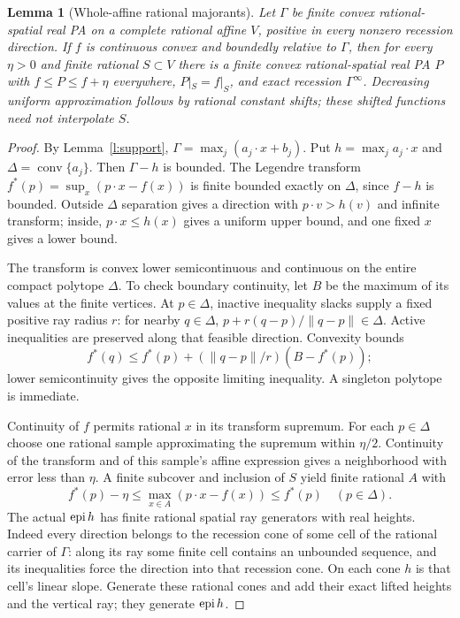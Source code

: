 \documentclass[11pt]{article}
\newtheorem{lemma}[theorem]{Lemma}
\theoremstyle{definition}\newtheorem{definition}[theorem]{Definition}
\theoremstyle{remark}\newtheorem{remark}[theorem]{Remark}
\newcommand{\conv}{\operatorname{conv}}\newcommand{\cone}{\operatorname{cone}}
\begin{document}
\begin{lemma}[Whole-affine rational majorants]\label{l:majorant}
Let $\Gamma$ be finite convex rational-spatial real PA on a complete rational affine $V$, positive in every nonzero recession direction. If $f$ is continuous convex and boundedly relative to $\Gamma$, then for every $\eta>0$ and finite rational $S\subset V$ there is a finite convex rational-spatial real PA $P$ with $f\leq P\leq f+\eta$ everywhere, $P|_S=f|_S$, and exact recession $\Gamma^\infty$. Decreasing uniform approximation follows by rational constant shifts; these shifted functions need not interpolate $S$.
\end{lemma}
\begin{proof}
By Lemma~\ref{l:support}, $\Gamma=\max_j(a_j\cdot x+b_j)$. Put $h=\max_j a_j\cdot x$ and $\Delta=\conv\{a_j\}$. Then $\Gamma-h$ is bounded. The Legendre transform $f^*(p)=\sup_x(p\cdot x-f(x))$ is finite bounded exactly on $\Delta$, since $f-h$ is bounded. Outside $\Delta$ separation gives a direction with $p\cdot v>h(v)$ and infinite transform; inside, $p\cdot x\leq h(x)$ gives a uniform upper bound, and one fixed $x$ gives a lower bound.

The transform is convex lower semicontinuous and continuous on the entire compact polytope $\Delta$. To check boundary continuity, let $B$ be the maximum of its values at the finite vertices. At $p\in\Delta$, inactive inequality slacks supply a fixed positive ray radius $r$: for nearby $q\in\Delta$, $p+r(q-p)/\|q-p\|\in\Delta$. Active inequalities are preserved along that feasible direction. Convexity bounds
\[
 f^*(q)\leq f^*(p)+(\|q-p\|/r)(B-f^*(p));
\]
lower semicontinuity gives the opposite limiting inequality. A singleton polytope is immediate.

Continuity of $f$ permits rational $x$ in its transform supremum. For each $p\in\Delta$ choose one rational sample approximating the supremum within $\eta/2$. Continuity of the transform and of this sample's affine expression gives a neighborhood with error less than $\eta$. A finite subcover and inclusion of $S$ yield finite rational $A$ with
\[
 f^*(p)-\eta\leq\max_{x\in A}(p\cdot x-f(x))\leq f^*(p)
 \quad(p\in\Delta).
\]
The actual $\operatorname{epi} h$ has finite rational spatial ray generators with real heights. Indeed every direction belongs to the recession cone of some cell of the rational carrier of $\Gamma$: along its ray some finite cell contains an unbounded sequence, and its inequalities force the direction into that recession cone. On each cone $h$ is that cell's linear slope. Generate these rational cones and add their exact lifted heights and the vertical ray; they generate $\operatorname{epi} h$.


\end{proof}
\end{document}
